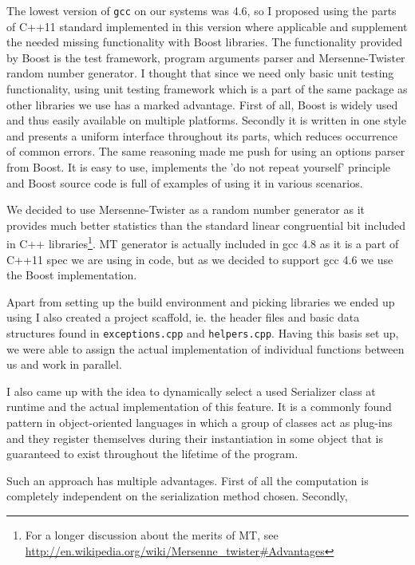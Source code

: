 \documentclass[11pt,a4paper]{article}
\begin{document}
The lowest version of \texttt{gcc} on our systems was 4.6, so I proposed using the parts of C++11 standard implemented in this version where applicable and supplement the needed missing functionality with Boost libraries. 
The functionality provided by Boost is the test framework, program arguments parser and Mersenne-Twister random number generator. I thought that since we need only basic unit testing functionality, using unit testing framework which is a part of the same package as other libraries we use has a marked advantage. First of all, Boost is widely used and thus easily available on multiple platforms. Secondly it is written in one style and presents a uniform interface throughout its parts, which reduces occurrence of common errors. 
The same reasoning made me push for using an options parser from Boost. It is easy to use, implements the 'do not repeat yourself' principle and Boost source code is full of examples of using it in various scenarios. 

We decided to use Mersenne-Twister as a random number generator as it provides much better statistics than the standard linear congruential bit included in C++ libraries\footnote{For a longer discussion about the merits of MT, see \url{http://en.wikipedia.org/wiki/Mersenne_twister#Advantages}}. MT generator is actually included in gcc 4.8 as it is a part of C++11 spec we are using in code, but as we decided to support gcc 4.6 we use the Boost implementation.

Apart from setting up the build environment and picking libraries we ended up using I also created a project scaffold, ie. the header files and basic data structures found in \texttt{exceptions.cpp} and \texttt{helpers.cpp}. Having this basis set up, we were able to assign the actual implementation of individual functions between us and work in parallel. 

I also came up with the idea to dynamically select a used Serializer class at runtime and the actual implementation of this feature. It is a commonly found pattern in object-oriented languages in which a group of classes act as plug-ins and they register themselves during their instantiation in some object that is guaranteed to exist throughout the lifetime of the program. 

Such an approach has multiple advantages. First of all the computation is completely independent on the serialization method chosen. Secondly, 
\end{document}
